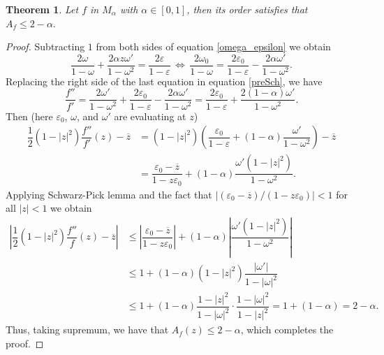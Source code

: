 \documentclass[reqno]{amsart}
\theoremstyle{plain}
\newtheorem{theo}{Theorem}[section]
\theoremstyle{definition}
\begin{document}
\begin{theo} Let $f$ in $M_\alpha$ with $\alpha\in [0,1]$, then its order satisfies that $A_f\leq 2-\alpha.$
\end{theo}

\begin{proof} Subtracting $1$ from both sides of equation \eqref{omega_epsilon} we obtain
\begin{equation*}
    \dfrac{2\omega}{1-\omega}+\dfrac{2\alpha z\omega'}{1-\omega^2}=\dfrac{2\varepsilon}{1-\varepsilon}\,\Leftrightarrow\,\dfrac{2\omega_0}{1-\omega}=\dfrac{2\varepsilon_0}{1-\varepsilon}-\dfrac{2\alpha\omega'}{1-\omega^2}.
\end{equation*}
Replacing the right side of the last equation in equation \eqref{preSch}, we have
\begin{equation*}
    \dfrac{f''}{f'}=\dfrac{2\omega'}{1-\omega^2}+\dfrac{2\varepsilon_0}{1-\varepsilon}-\dfrac{2\alpha\omega'}{1-\omega^2}=\dfrac{2\varepsilon_0}{1-\varepsilon}+\dfrac{2(1-\alpha)\omega'}{1-\omega^2}.
\end{equation*}
Then (here $\varepsilon_0$, $\omega$, and $\omega'$ are evaluating at $z$)
\begin{align*}
\dfrac{1}{2}(1-|z|^2)\dfrac{f''}{f'}(z)-\overline{z} & =  (1-|z|^2)\left(\dfrac{\varepsilon_0}{1-\varepsilon}+(1-\alpha)\dfrac{\omega'}{1-\omega^2}\right)-\overline{z}\\
& =  \dfrac{\varepsilon_0-\overline{z}}{1-z\varepsilon_0}+(1-\alpha)\dfrac{\omega'(1-|z|^2)}{1-\omega^2}.
\end{align*}
Applying Schwarz-Pick lemma and the fact that $|(\varepsilon_0-\overline{z})/(1-z\varepsilon_0)|<1$ for all $|z|<1$ we obtain
\begin{align*}
    \left|\dfrac{1}{2}(1-|z|^2)\dfrac{f''}{f}(z)-\overline{z}\right| & \leq \left|\dfrac{\varepsilon_0-\overline{z}}{1-z\varepsilon_0}\right|+(1-\alpha)\left|\dfrac{\omega'(1-|z|^2)}{1-\omega^2}\right|\\
    & \leq 1+(1-\alpha)(1-|z|^2)\dfrac{|\omega'|}{1-|\omega|^2}\\
    & \leq 1+(1-\alpha)\dfrac{1-|z|^2}{1-|\omega|^2}\cdot\dfrac{1-|\omega|^2}{1-|z|^2}=1+(1-\alpha)=2-\alpha.
\end{align*}
Thus, taking supremum, we have that $A_f(z)\leq 2-\alpha$, which completes the proof.
\end{proof}
\end{document}
